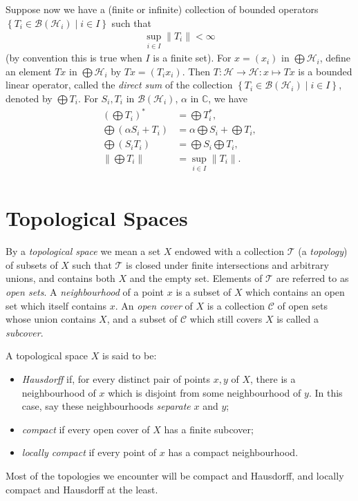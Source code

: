 \documentclass[11pt,a4paper]{report}
\theoremstyle{plain}
\theoremstyle{definition}
\newcommand{\1}{\mathbbm{1}}
\newcommand{\C}{\mathbb{C}}
\renewcommand{\H}{\mathcal{H}}
\newcommand{\B}{\mathcal{B}}
\newcommand{\T}{\mathcal{T}}
\newcommand{\cover}{\mathcal{C}}
\renewcommand{\oplus}{\textstyle\bigoplus}
\begin{document}
Suppose now we have a (finite or infinite) collection of bounded operators 
$\left\{T_i\in \B{(\H_i)} \mid i\in I\right\}$ such that
\begin{align*}
	\sup_{i\in I} {\left\|T_i\right\|} < \infty
\end{align*} 
(by convention this is true when $I$ is a finite set).
For $x=(x_i)$ in $\oplus\H_i$, define an element $Tx$ in $\oplus\H_i$ by 
$Tx=(T_ix_i)$. Then $T:\H\to\H:x\mapsto Tx$ is a bounded linear operator, called 
the \emph{direct sum} of the collection $\left\{T_i\in\B{(\H_i)} \mid i \in 
I\right\}$, denoted by $\oplus T_i$. For $S_i,T_i$ in $\B(\H_i)$, $\alpha$ in 
$\C$, we have 
\begin{align*}
		\left(\oplus T_i\right)^\ast &= \oplus T_i^\ast,										\\
		\oplus (\alpha S_i+ T_i) &= 
					\alpha \oplus S_i + \oplus T_i, 											\\
		\oplus (S_i T_i) &= \oplus S_i \oplus T_i,												\\
		\left\|\oplus T_i\right\| &= \sup_{i\in I} {\left\|T_i\right\|}.						\\
\end{align*}

\section{Topological Spaces}\label{section:topology}
By a \emph{topological space} we mean a set $X$ endowed with a collection $\T$ 
(a \emph{topology}) of subsets of $X$ such that $\T$ is closed under finite 
intersections and arbitrary unions, and contains both $X$ and the empty set. 
Elements of $\T$ are referred to as \emph{open sets}.
A \emph{neighbourhood} of a point $x$ is a subset of $X$ which contains an open 
set which itself contains $x$. An \emph{open cover} of $X$ is a collection 
$\cover$ of open sets whose union contains $X$, and a subset of $\cover$ which 
still covers $X$ is called a \emph{subcover}. 

A topological space $X$ is said to be:
\begin{itemize}
	\item \emph{Hausdorff} if, for every distinct pair of points $x,y$ of $X$, 
	there is a neighbourhood of $x$ which is disjoint from some neighbourhood of 
	$y$. In this case, say these neighbourhoods \emph{separate} $x$ and $y$;
	\item \emph{compact} if every open cover of $X$ has a finite subcover;
	\item \emph{locally compact} if every point of $x$ has a compact neighbourhood.
\end{itemize}
Most of the topologies we encounter will be compact and Hausdorff, and locally compact 
and Hausdorff at the least.
\end{document}
